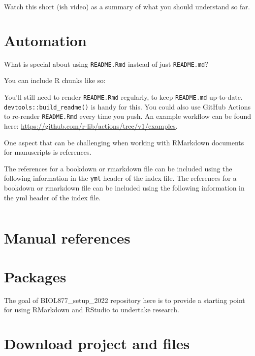 \documentclass[
]{book}
\begin{document}
Watch this short (ish video) as a summary of what you should understand so far.

\hypertarget{automation}{%
\section{Automation}\label{automation}}

What is special about using \texttt{README.Rmd} instead of just \texttt{README.md}?

You can include R chunks like so:

You'll still need to render \texttt{README.Rmd} regularly, to keep \texttt{README.md} up-to-date. \texttt{devtools::build\_readme()} is handy for this. You could also use GitHub Actions to re-render \texttt{README.Rmd} every time you push. An example workflow can be found here: \url{https://github.com/r-lib/actions/tree/v1/examples}.

One aspect that can be challenging when working with RMarkdown documents for manuscripts is references.

The references for a bookdown or rmarkdown file can be included using the following information in the \texttt{yml} header of the index file.
The references for a bookdown or rmarkdown file can be included using the following information in the yml header of the index file.

\begin{verbatim}
\end{verbatim}

\hypertarget{manual-references}{%
\section{Manual references}\label{manual-references}}

\hypertarget{packages}{%
\section{Packages}\label{packages}}

The goal of BIOL877\_setup\_2022 repository here is to provide a starting point for using RMarkdown and RStudio to undertake research.

\hypertarget{download-project-and-files}{%
\section{Download project and files}\label{download-project-and-files}}
\end{document}

